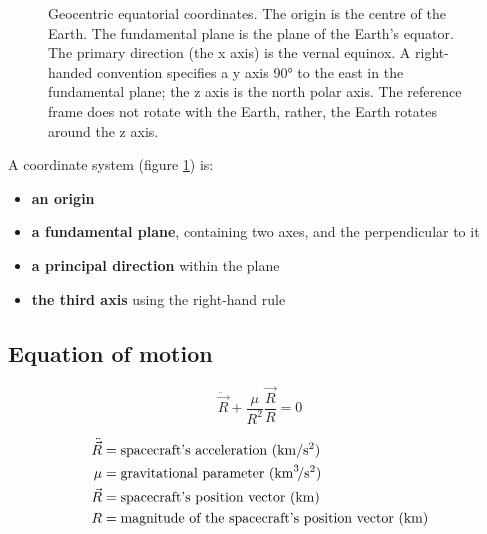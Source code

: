 \documentclass{article}
\begin{document}
\begin{figure}[!h]
	\centering
	\caption{Geocentric equatorial coordinates. The origin is the centre of the Earth. The fundamental plane is the plane of the Earth's equator. The primary direction (the x axis) is the vernal equinox. A right-handed convention specifies a y axis 90° to the east in the fundamental plane; the z axis is the north polar axis. The reference frame does not rotate with the Earth, rather, the Earth rotates around the z axis.}
	\label{fig:coordinate_system}
\end{figure}


A coordinate system (figure \ref{fig:coordinate_system}) is:
\begin{itemize}
	\item \textbf{an origin}
	\item \textbf{a fundamental plane}, containing two axes, and the perpendicular to it
	\item \textbf{a principal direction} within the plane
	\item \textbf{the third axis} using the right-hand rule
\end{itemize}

\subsection{Equation of motion}
\begin{equation*}
\boxed{\ddot{\vec{R}} + \dfrac{\mu}{R^{2}} \dfrac{\vec{R}}{R} = 0}
\end{equation*}

\begin{align*}
\ddot{\vec{R}} &= \text{spacecraft's acceleration (\si{\kilo\meter\per\second\squared})}\\
\mu &= \text{gravitational parameter (\si{\kilo\meter\cubed\per\second\squared})}\\
\vec{R} &= \text{spacecraft's position vector (\si{\kilo\meter})}\\
R &= \text{magnitude of the spacecraft's position vector (\si{\kilo\meter})}\\
\end{align*}
\end{document}
